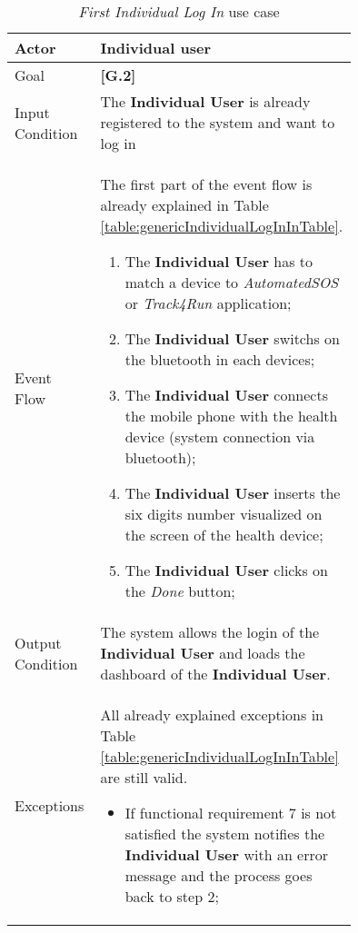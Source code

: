 \begin{center}
\begin{table}
\begin{tabular}{ | l | p{0.75\linewidth} | }
  \hline
    Actor & \textbf{Individual user} \\ \hline
    Goal & \textbf{[G.2]} \\ \hline
    Input Condition & The \textbf{Individual User} is already registered to the system and want to log in \\ \hline
    Event Flow & \begin{minipage}[t]{0.7\textwidth}
      The first part of the event flow is already explained in Table \ref{table:genericIndividualLogInInTable}.
      \smallskip
      \begin{enumerate}
        \item The \textbf{Individual User} has to match a device to \textit{AutomatedSOS} or \textit{Track4Run} application;
        \item The \textbf{Individual User} switchs on the bluetooth in each devices;
        \item The \textbf{Individual User} connects the mobile phone with the health device (system connection via bluetooth);
        \item The \textbf{Individual User} inserts the six digits number visualized on the screen of the health device;
        \item The \textbf{Individual User} clicks on the \textit{Done} button;
      \end{enumerate}
    \smallskip
  \end{minipage} \\ \hline
  Output Condition & The system allows the login of the \textbf{Individual User} and loads the dashboard of the \textbf{Individual User}. \\ \hline
  Exceptions & \begin{minipage}[t]{0.7\textwidth}
    All already explained exceptions in Table \ref{table:genericIndividualLogInInTable} are still valid.
    \begin{itemize}
      \smallskip
      \item If functional requirement 7 is not satisfied the system notifies the \textbf{Individual User} with an error message and the process goes back to step 2;
    \end{itemize}
    \smallskip
  \end{minipage}  \\ \hline
\end{tabular}
\caption{\textit{First Individual Log In} use case}
\label{table:firstIndividualLogInInTable}
\end{table}
\end{center}
